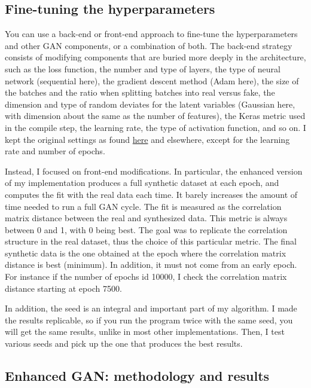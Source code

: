 \documentclass[oneside,10pt]{book}
\begin{document}
\subsection{Fine-tuning the hyperparameters}

You can use a back-end or front-end approach to fine-tune the hyperparameters and other GAN components, or a combination of both. The back-end strategy consists of
 modifying components that are buried more deeply in the architecture, such as the loss function, the number and type of layers,
the type of neural network (sequential here), the gradient descent method (Adam here), the size of the batches and the ratio when splitting batches into real versus fake, the dimension and type of random deviates for the latent variables (Gaussian here, with dimension about the same as the number of features),
the Keras metric used in the compile step, the learning rate, the type of activation function, and so on. I kept the original settings
 as found \href{https://towardsdatascience.com/hands-on-generative-adversarial-networks-gan-for-signal-processing-with-python-ff5b8d78bd28}{here} and elsewhere, except for the learning rate and number of epochs.

Instead, I focused on front-end modifications. In particular, the enhanced version of my implementation produces a full synthetic
 dataset at each epoch, and computes the fit with the real data each time. It barely increases the amount of time needed to run a full GAN cycle.
The fit is measured as the correlation matrix distance between the
 real and synthesized data. This
 metric is always between 0 and 1, with 0 being best. The goal was to replicate the correlation structure in the real dataset, thus the choice of this particular metric.  The final synthetic data is the one obtained at the epoch where the correlation matrix distance is best (minimum).
In addition, it must not come from an early epoch. For instance if the number of epochs id \num{10000}, I check the
correlation matrix distance starting at epoch 7500.


In addition,  the \textcolor{index}{seed} is an integral and important part of my algorithm. I made the
results replicable, so if you run the program twice with the same seed, you will get the same results, unlike in most other
 implementations.  Then, I test various seeds and pick up the one that produces the best results.


\subsection{Enhanced GAN: methodology and results}\label{enhgfd}
\end{document}
